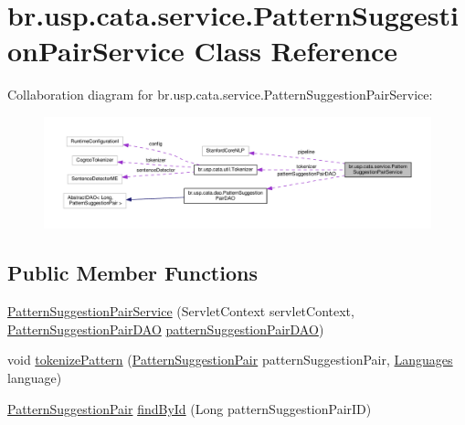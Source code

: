 \hypertarget{classbr_1_1usp_1_1cata_1_1service_1_1_pattern_suggestion_pair_service}{\section{br.\+usp.\+cata.\+service.\+Pattern\+Suggestion\+Pair\+Service Class Reference}
\label{classbr_1_1usp_1_1cata_1_1service_1_1_pattern_suggestion_pair_service}
}


Collaboration diagram for br.\+usp.\+cata.\+service.\+Pattern\+Suggestion\+Pair\+Service\+:\nopagebreak
\begin{figure}[H]
\begin{center}
\leavevmode
\includegraphics[width=350pt]{classbr_1_1usp_1_1cata_1_1service_1_1_pattern_suggestion_pair_service__coll__graph}
\end{center}
\end{figure}
\subsection*{Public Member Functions}
\begin{DoxyCompactItemize}
\item 
\hyperlink{classbr_1_1usp_1_1cata_1_1service_1_1_pattern_suggestion_pair_service_a334b04e35116c8739b1e2b3afd8f3d74}{Pattern\+Suggestion\+Pair\+Service} (Servlet\+Context servlet\+Context, \hyperlink{classbr_1_1usp_1_1cata_1_1dao_1_1_pattern_suggestion_pair_d_a_o}{Pattern\+Suggestion\+Pair\+D\+A\+O} \hyperlink{classbr_1_1usp_1_1cata_1_1service_1_1_pattern_suggestion_pair_service_a5969c6f6b0cc6832dc8397d969da7692}{pattern\+Suggestion\+Pair\+D\+A\+O})
\item 
void \hyperlink{classbr_1_1usp_1_1cata_1_1service_1_1_pattern_suggestion_pair_service_a1d7c7e2498baf14f7c08b6f6bdd3a239}{tokenize\+Pattern} (\hyperlink{classbr_1_1usp_1_1cata_1_1model_1_1_pattern_suggestion_pair}{Pattern\+Suggestion\+Pair} pattern\+Suggestion\+Pair, \hyperlink{enumbr_1_1usp_1_1cata_1_1model_1_1_languages}{Languages} language)
\item 
\hyperlink{classbr_1_1usp_1_1cata_1_1model_1_1_pattern_suggestion_pair}{Pattern\+Suggestion\+Pair} \hyperlink{classbr_1_1usp_1_1cata_1_1service_1_1_pattern_suggestion_pair_service_af0309a068c071650cfe27a6f1351ed03}{find\+By\+Id} (Long pattern\+Suggestion\+Pair\+I\+D)
\end{DoxyCompactItemize}
